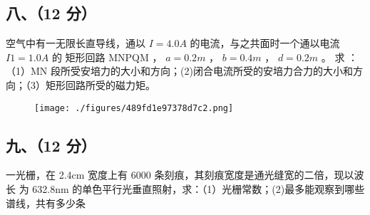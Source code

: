 \subsection{八、（12 分）}
空气中有一无限长直导线，通以 $I=4.0A$ 的电流，与之共面时一个通以电流 $I1=1.0A$ 的 矩形回路 MNPQM ， $a=0.2m$ ， $b=0.4m$ ， $d=0.2m$ 。 求 ：（1）MN 段所受安培力的大小和方向；(2)闭合电流所受的安培力合力的大小和方向；（3）矩形回路所受的磁力矩。
\begin{figure}[ht]
\centering
\texttt{[image: ./figures/489fd1e97378d7c2.png]}
\caption{} \label{fig_NJUB07_4}
\end{figure}
\subsection{九、（12 分）}
一光栅，在 2.4cm 宽度上有 6000 条刻痕，其刻痕宽度是通光缝宽的二倍，现以波长 为 632.8nm 的单色平行光垂直照射，求：（1）光栅常数；(2)最多能观察到哪些谱线，共有多少条